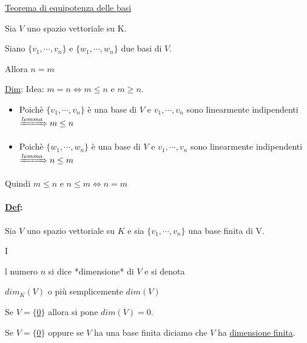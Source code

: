\documentclass{article}
\newcommand{\ul}[1]{\underline{#1}}
\newcommand{\Def}[2]{\paragraph{\ul{Def}:}#1\\\hspace*{3em}\begin{minipage}{.8\textwidth}#2\end{minipage}}
\begin{document}
\ul{Teorema di equipotenza delle basi}

Sia $V$ uno spazio vettoriale su K.

Siano $\{v_1,\cdots,v_n\}$ e $\{w_1,\cdots,w_n\}$ due basi di $V$.

Allora $n=m$

\ul{Dim}: Idea: $m=n\Leftrightarrow m\le n$ e $m\ge n$.
\begin{itemize}
	\item Poichè $\{v_1,\cdots,v_n\}$ è una base di $V$ e $v_1,\cdots,v_n$ sono linearmente indipendenti $\xRightarrow{lemma}m\le n$
	\item Poichè $\{w_1,\cdots,w_n\}$ è una base di $V$ e $v_1,\cdots,v_n$ sono linearmente indipendenti $\xRightarrow{lemma}n\le m$
\end{itemize}

Quindi $m\le n$ e $n\le m\Leftrightarrow n=m$

\Def{Sia $V$ uno spazio vettoriale su $K$ e sia $\{v_1,\cdots,v_n\}$ una base finita di V.}

Il numero $n$ si dice *dimensione* di $V$ e si denota

$dim_K(V)$ o più semplicemente $dim(V)$

Se $V=\{$\ul{0}$\}$ allora si pone $dim(V)=0$.

Se $V=\{$\ul{0}$\}$ oppure se $V$ ha una base finita diciamo che $V$ ha \ul{dimensione finita}.
\end{document}
